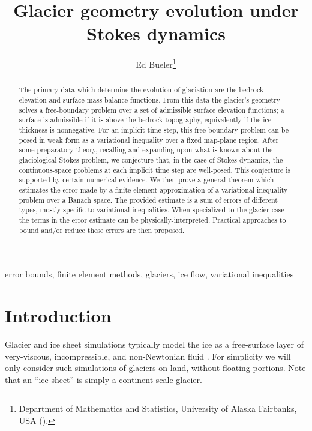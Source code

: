 \documentclass[hidelinks,onefignum,onetabnum,final]{siamart220329}  %
\title{Glacier geometry evolution under Stokes dynamics}
\author{Ed Bueler\thanks{Department of Mathematics and Statistics, University of Alaska Fairbanks, USA (\email{elbueler@alaska.edu}).}}
\begin{document}
\maketitle

\begin{abstract}
The primary data which determine the evolution of glaciation are the bedrock elevation and surface mass balance functions.  From this data the glacier's geometry solves a free-boundary problem over a set of admissible surface elevation functions; a surface is admissible if it is above the bedrock topography, equivalently if the ice thickness is nonnegative.  For an implicit time step, this free-boundary problem can be posed in weak form as a variational inequality over a fixed map-plane region.  After some preparatory theory, recalling and expanding upon what is known about the glaciological Stokes problem, we conjecture that, in the case of Stokes dynamics, the continuous-space problems at each implicit time step are well-posed.  This conjecture is supported by certain numerical evidence.  We then prove a general theorem which estimates the error made by a finite element approximation of a variational inequality problem over a Banach space.  The provided estimate is a sum of errors of different types, mostly specific to variational inequalities.  When specialized to the glacier case the terms in the error estimate can be physically-interpreted.  Practical approaches to bound and/or reduce these errors are then proposed.
\end{abstract}

\begin{keywords}
error bounds, finite element methods, glaciers, ice flow, variational inequalities
\end{keywords}



\section{Introduction} \label{sec:intro}

Glacier and ice sheet simulations typically model the ice as a free-surface layer of very-viscous, incompressible, and non-Newtonian fluid \cite{GreveBlatter2009,SchoofHewitt2013}.  For simplicity we will only consider such simulations of glaciers on land, without floating portions.  Note that an ``ice sheet'' is simply a continent-scale glacier.
\end{document}
